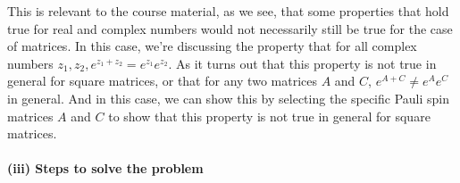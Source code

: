 \documentclass{article}
\begin{document}
This is relevant to the course material, as we see, that some properties that hold true for real and complex numbers would not necessarily still be true for the case of matrices. In this case, we're discussing the property that for all complex numbers $z_1, z_2, e^{z_1 + z_2} = e^{z_1}e^{z_2}$. As it turns out that this property is not true in general for square matrices, or that for any two matrices $A$ and $C$, $e^{A+C} \neq e^Ae^C$ in general. And in this case, we can show this by selecting the specific Pauli spin matrices $A$ and $C$ to show that this property is not true in general for square matrices.

\paragraph{(iii) Steps to solve the problem}
	
\end{document}
